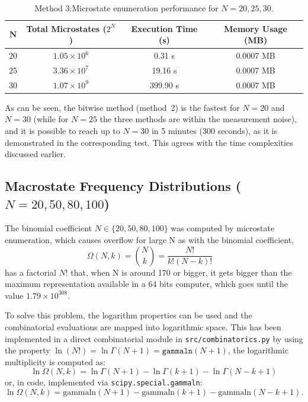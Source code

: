 \documentclass[10pt, a4paper]{article}
\begin{document}
\begin{table}[H]
\centering
\caption{Method 3:Microstate enumeration performance for $N = 20, 25, 30$.}
\vspace{0.5em}
\begin{tabular}{c c c c}
\toprule
$\mathbf{N}$ & \textbf{Total Microstates ($2^N$)} & \textbf{Execution Time (s)} & \textbf{Memory Usage (MB)} \\
\midrule
20 & $1.05 \times 10^6$ & 0.31 s & 0.0007 MB \\
25 & $3.36 \times 10^7$ & 19.16 s & 0.0007 MB \\
30 & $1.07 \times 10^9$ & 399.90 s & 0.0007 MB \\
\bottomrule
\end{tabular}
\end{table}
As can be seen, the bitwise method (method~2) is the fastest for $N=20$
and $N=30$ (while for $N=25$ the three methods are within the
measurement noise), and it is possible to reach up to $N = 30$ in 5 minutes (300 seconds), as it is demonstrated in the corresponding test. This agrees with the time complexities discussed earlier.




    
\subsection{Macrostate Frequency Distributions ($N=20, 50, 80, 100$)}


\newline

The binomial coefficient $N \in \{20, 50, 80, 100\}$ was computed by microstate enumeration, which causes overflow for large N as with the binomial coefficient,
$$\Omega(N, k) = \binom{N}{k} = \frac{N!}{k!(N-k)!} \quad$$ 
has a factorial $N!$ that, when N is around 170 or bigger, it gets bigger than the maximum representation available in a 64 bits computer, which goes until the value  $1.79 \times 10^{308}$. 


To solve this problem, the logarithm properties can be used and the combinatorial evaluations are mapped into logarithmic space. This has been implemented in a direct combinatorial module in \texttt{src/combinatorics.py} by using the property $\ln(N!) = \ln \Gamma(N + 1) = \texttt{gammaln}(N + 1)$, the logarithmic multiplicity is computed as:
\begin{equation}
\ln \Omega(N,k) = \ln \Gamma(N+1) - \ln \Gamma(k+1) - \ln \Gamma(N-k+1)
\end{equation}
or, in code, implemented via \texttt{scipy.special.gammaln}:
\begin{equation}
    \ln \Omega(N, k) = \text{gammaln}(N + 1) - \text{gammaln}(k + 1) - \text{gammaln}(N - k + 1).
\end{equation}
\end{document}
